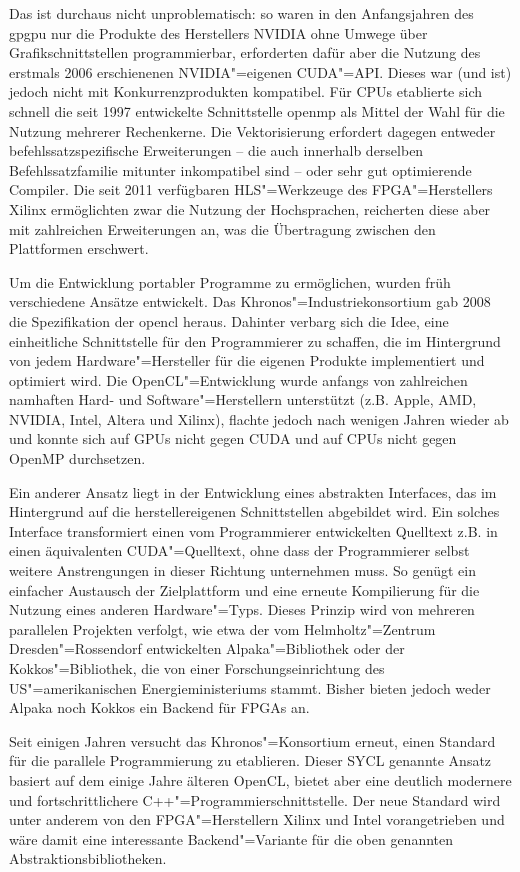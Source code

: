Das ist durchaus nicht unproblematisch: so waren in den Anfangsjahren des
\gls{gpgpu} nur die Produkte des Herstellers NVIDIA ohne Umwege über
Grafikschnittstellen programmierbar, erforderten dafür aber die Nutzung des
erstmals 2006 erschienenen NVIDIA"=eigenen CUDA"=API. Dieses war (und ist)
jedoch nicht mit Konkurrenzprodukten kompatibel. Für CPUs etablierte sich
schnell die seit 1997 entwickelte Schnittstelle \gls{openmp} als Mittel der Wahl
für die Nutzung mehrerer Rechenkerne. Die Vektorisierung erfordert dagegen
entweder befehlssatzspezifische Erweiterungen -- die auch innerhalb derselben
Befehlssatzfamilie mitunter inkompatibel sind -- oder sehr gut optimierende
Compiler. Die seit 2011 verfügbaren HLS"=Werkzeuge des FPGA"=Herstellers Xilinx
ermöglichten zwar die Nutzung der Hochsprachen, reicherten diese aber mit
zahlreichen Erweiterungen an, was die Übertragung zwischen den Plattformen
erschwert.

Um die Entwicklung portabler Programme zu ermöglichen, wurden früh verschiedene
Ansätze entwickelt. Das Khronos"=Industriekonsortium gab 2008 die Spezifikation
der \gls{opencl} heraus. Dahinter verbarg sich die Idee, eine einheitliche
Schnittstelle für den Programmierer zu schaffen, die im Hintergrund von
jedem Hardware"=Hersteller für die eigenen Produkte implementiert und optimiert
wird. Die OpenCL"=Entwicklung wurde anfangs von zahlreichen namhaften Hard- und
Software"=Herstellern unterstützt (z.B. Apple, AMD, NVIDIA, Intel, Altera und
Xilinx), flachte jedoch nach wenigen Jahren wieder ab und konnte sich auf GPUs
nicht gegen CUDA und auf CPUs nicht gegen OpenMP durchsetzen.

Ein anderer Ansatz liegt in der Entwicklung eines abstrakten Interfaces, das im
Hintergrund auf die herstellereigenen Schnittstellen abgebildet wird. Ein
solches Interface transformiert einen vom Programmierer entwickelten Quelltext
z.B. in einen äquivalenten CUDA"=Quelltext, ohne dass der Programmierer selbst
weitere Anstrengungen in dieser Richtung unternehmen muss. So genügt ein
einfacher Austausch der Zielplattform und eine erneute Kompilierung für die
Nutzung eines anderen Hardware"=Typs. Dieses Prinzip wird von mehreren
parallelen Projekten verfolgt, wie etwa der vom Helmholtz"=Zentrum
Dresden"=Rossendorf entwickelten Alpaka"=Bibliothek oder der Kokkos"=Bibliothek,
die von einer Forschungseinrichtung des US"=amerikanischen Energieministeriums
stammt. Bisher bieten jedoch weder Alpaka noch Kokkos ein Backend für FPGAs an.

Seit einigen Jahren versucht das Khronos"=Konsortium erneut, einen Standard für
die parallele Programmierung zu etablieren. Dieser SYCL genannte Ansatz basiert
auf dem einige Jahre älteren OpenCL, bietet aber eine deutlich modernere und
fortschrittlichere C++"=Programmierschnittstelle. Der neue Standard wird unter
anderem von den FPGA"=Herstellern Xilinx und Intel vorangetrieben und wäre damit
eine interessante Backend"=Variante für die oben genannten
Abstraktionsbibliotheken.

